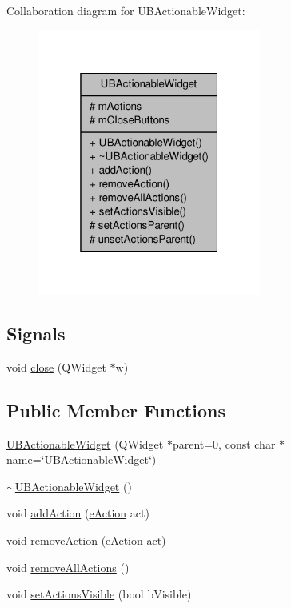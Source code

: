 Collaboration diagram for U\-B\-Actionable\-Widget\-:
\nopagebreak
\begin{figure}[H]
\begin{center}
\leavevmode
\includegraphics[width=208pt]{d9/d8c/class_u_b_actionable_widget__coll__graph}
\end{center}
\end{figure}
\subsection*{Signals}
\begin{DoxyCompactItemize}
\item 
void \hyperlink{class_u_b_actionable_widget_a8c6d3747f77809ba16d13b85c9ed6e67}{close} (Q\-Widget $\ast$w)
\end{DoxyCompactItemize}
\subsection*{Public Member Functions}
\begin{DoxyCompactItemize}
\item 
\hyperlink{class_u_b_actionable_widget_af32171f29ba03fbdf6029d8f8c16547c}{U\-B\-Actionable\-Widget} (Q\-Widget $\ast$parent=0, const char $\ast$name=\char`\"{}U\-B\-Actionable\-Widget\char`\"{})
\item 
\hyperlink{class_u_b_actionable_widget_a5cfc37bf9d674a1e4fee1782a6868622}{$\sim$\-U\-B\-Actionable\-Widget} ()
\item 
void \hyperlink{class_u_b_actionable_widget_ae1c1866157c89fbc104e5e8b06a0b5a5}{add\-Action} (\hyperlink{_u_b_actionable_widget_8h_a0fa695ac021b50f72dc2656fd68768a1}{e\-Action} act)
\item 
void \hyperlink{class_u_b_actionable_widget_ad700c6071729d5eba632a064a6906fd2}{remove\-Action} (\hyperlink{_u_b_actionable_widget_8h_a0fa695ac021b50f72dc2656fd68768a1}{e\-Action} act)
\item 
void \hyperlink{class_u_b_actionable_widget_a70f50d1babe69bd5ed5f48ba8a9c8d03}{remove\-All\-Actions} ()
\item 
void \hyperlink{class_u_b_actionable_widget_a1aa5129030acfb692abf6ab0d7f9e53a}{set\-Actions\-Visible} (bool b\-Visible)
\end{DoxyCompactItemize}
